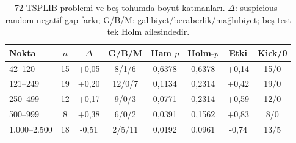\begin{table}[!htbp]
 \centering\small\setlength{\tabcolsep}{3pt}
 \caption{72 TSPLIB problemi ve beş tohumda boyut katmanları. $\Delta$: suspicious--random negatif-gap farkı; G/B/M: galibiyet/beraberlik/mağlubiyet; beş test tek Holm ailesindedir.}
 \label{tab:tsplib-scale}
\begin{tabular*}{\textwidth}{@{\extracolsep{\fill}}lccccccc}
\toprule
Nokta & $n$ & $\Delta$ & G/B/M & Ham $p$ & Holm-$p$ & Etki & Kick/0 \\
\midrule
42--120 & 15 & +0,05 & 8/1/6 & 0,6378 & 0,6378 & +0,14 & 15/0 \\
121--249 & 19 & +0,20 & 12/0/7 & 0,1134 & 0,2314 & +0,42 & 19/0 \\
250--499 & 12 & +0,17 & 9/0/3 & 0,0771 & 0,2314 & +0,59 & 12/0 \\
500--999 & 8 & +0,38 & 6/0/2 & 0,0391 & 0,1562 & +0,83 & 8/0 \\
1.000--2.500 & 18 & -0,51 & 2/5/11 & 0,0192 & 0,0961 & -0,74 & 13/5 \\
\bottomrule
\end{tabular*}
\end{table}
